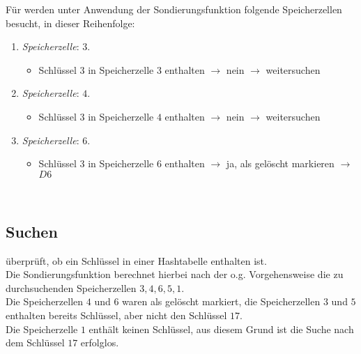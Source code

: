 \noindent
Für  werden unter Anwendung der Sondierungsfunktion folgende Speicherzellen besucht, in dieser Reihenfolge: \\
\begin{enumerate}
    \item \textit{Speicherzelle}: $3$.
    \begin{itemize}
        \item Schlüssel $3$ in Speicherzelle $3$ enthalten $\rightarrow$ nein $\rightarrow$ weitersuchen
    \end{itemize}
    \item \textit{Speicherzelle}: $4$.
    \begin{itemize}
        \item Schlüssel $3$ in Speicherzelle $4$ enthalten $\rightarrow$ nein $\rightarrow$ weitersuchen
    \end{itemize}
    \item \textit{Speicherzelle}: $6$.
    \begin{itemize}
        \item Schlüssel $3$ in Speicherzelle $6$ enthalten $\rightarrow$ ja, als gelöscht markieren $\rightarrow$ $D6$
    \end{itemize}
\end{enumerate}\\


\subsection*{Suchen}

 überprüft, ob ein Schlüssel in einer Hashtabelle enthalten ist.\\
Die Sondierungsfunktion berechnet hierbei nach der o.g. Vorgehensweise die zu durchsuchenden Speicherzellen $3, 4, 6, 5, 1$.\\
Die Speicherzellen $4$ und $6$ waren als gelöscht markiert, die Speicherzellen $3$ und $5$ enthalten bereits Schlüssel, aber nicht den Schlüssel $17$.\\
Die Speicherzelle $1$ enthält keinen Schlüssel, aus diesem Grund ist die Suche nach dem Schlüssel $17$ erfolglos.


